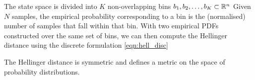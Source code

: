 The state space is divided into \(K\) non-overlapping bins \(b_1, b_2, \dotsc, b_K \subset \mathbb{R}^n\)
Given \(N\) samples, the empirical probability corresponding to a bin is the (normalised) number of samples that fall within that bin.
With two empirical PDFs constructed over the same set of bins, we can then compute the Hellinger distance using the discrete formulation \cref{eqn:hell_disc}

The Hellinger distance is symmetric and defines a metric on the space of probability distributions.















